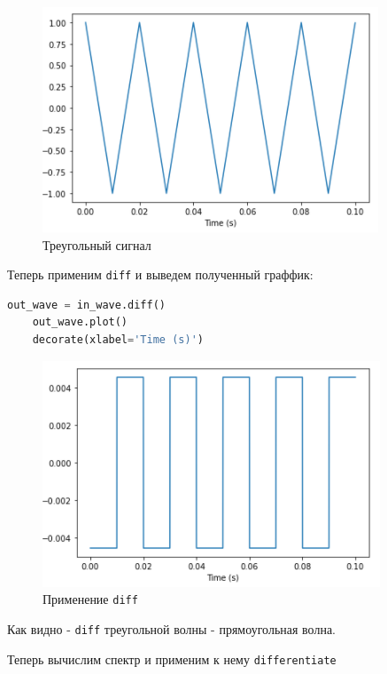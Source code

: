 \documentclass[a4paper]{article}
\begin{document}
            \begin{figure}[H]
                \centering
                \includegraphics{ex_2_1.png}
                \caption{Треугольный сигнал}
                \label{fig:ex_2_1}
            \end{figure}
            
            Теперь применим \texttt{diff} и выведем полученный граффик:
            
\begin{lstlisting}[language=Python, caption= Применение \texttt{diff}]
    out_wave = in_wave.diff()
    out_wave.plot()
    decorate(xlabel='Time (s)')
\end{lstlisting}
            
            \begin{figure}[H]
                \centering
                \includegraphics{ex_2_2.png}
                \caption{Применение \texttt{diff}}
                \label{fig:ex_2_2}
            \end{figure}
            
            Как видно - \texttt{diff} треугольной волны - прямоугольная волна.
            
            Теперь вычислим спектр и применим к нему \texttt{differentiate}
            
\end{document}
